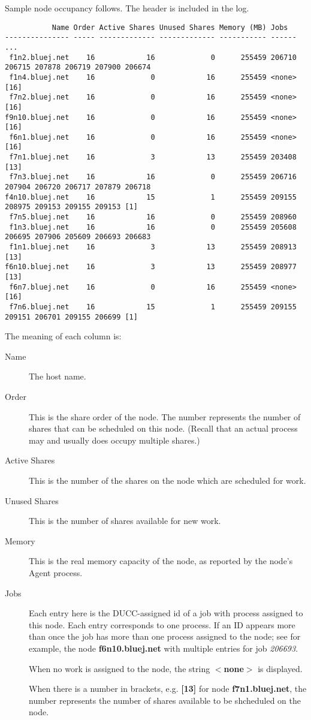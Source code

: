     Sample node occupancy follows.  The header is included in the log.
\begin{verbatim}
           Name Order Active Shares Unused Shares Memory (MB) Jobs
--------------- ----- ------------- ------------- ----------- ------ ...
 f1n2.bluej.net    16            16             0      255459 206710 206715 207878 206719 207900 206674 
 f1n4.bluej.net    16             0            16      255459 <none>[16]
 f7n2.bluej.net    16             0            16      255459 <none>[16]
f9n10.bluej.net    16             0            16      255459 <none>[16]
 f6n1.bluej.net    16             0            16      255459 <none>[16]
 f7n1.bluej.net    16             3            13      255459 203408 [13]
 f7n3.bluej.net    16            16             0      255459 206716 207904 206720 206717 207879 206718 
f4n10.bluej.net    16            15             1      255459 209155 208975 209153 209155 209153 [1]
 f7n5.bluej.net    16            16             0      255459 208960 
 f1n3.bluej.net    16            16             0      255459 205608 206695 207906 205609 206693 206683 
 f1n1.bluej.net    16             3            13      255459 208913 [13]
f6n10.bluej.net    16             3            13      255459 208977 [13]
 f6n7.bluej.net    16             0            16      255459 <none>[16]
 f7n6.bluej.net    16            15             1      255459 209155 209151 206701 209155 206699 [1]
\end{verbatim}

    The meaning of each column is:
    \begin{description}
      \item[Name] The host name.
      \item[Order] This is the share order of the node.  The number represents the number of shares
        that can be scheduled on this node. (Recall that an actual process may and usually does
        occupy multiple shares.)
      \item[Active Shares] This is the number of the shares on the node which are scheduled
        for work.
      \item[Unused Shares] This is the number of shares available for new work.
      \item[Memory] This is the real memory capacity of the node, as reported by the node's
        Agent process.
      \item[Jobs] Each entry here is the DUCC-assigned id of a job with process assigned to
        this node.  Each entry corresponds to one process.  If an ID appears more than 
        once the job has more than one process assigned to the node; see for example, the
        node {\bf f6n10.bluej.net} with multiple entries for job {\em 206693}.

        When no work is assigned to the node, the string {\bf $<$none$>$} is displayed.  
        
        When there is a number in brackets, e.g. {\bf [13]} for node {\bf f7n1.bluej.net}, the
        number represents the number of shares available to be shcheduled on the node.
    \end{description}
    
